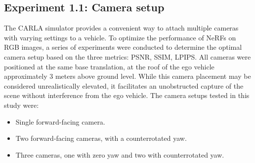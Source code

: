 \subsection{Experiment 1.1: Camera setup} \label{sec:exp-camera-setup}
The CARLA simulator provides a convenient way to attach multiple cameras with varying settings to a vehicle. To optimize the performance of NeRFs on RGB images, a series of experiments were conducted to determine the optimal camera setup based on the three metrics: PSNR, SSIM, LPIPS. All cameras were positioned at the same base translation, at the roof of the ego vehicle approximately 3 meters above ground level. While this camera placement may be considered unrealistically elevated, it facilitates an unobstructed capture of the scene without interference from the ego vehicle. The camera setups tested in this study were:

\begin{itemize}
    \item Single forward-facing camera.
    \item Two forward-facing cameras, with a counterrotated yaw.
    \item Three cameras, one with zero yaw and two with counterrotated yaw.
\end{itemize}

